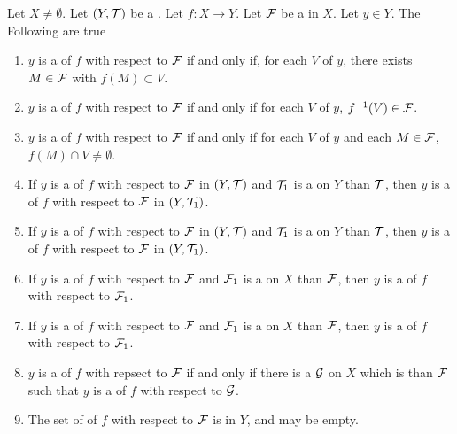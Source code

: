 \begin{prop}[\FunctionLimit]
\label{prop:FunctionLimit}
Let $X \neq \emptyset$. 
Let $(Y,\mathcal{T})$ be a \TopologicalSpace. 
Let $f:X \to Y$. 
Let $\mathcal{F}$ be a \Filter in $X$. 
Let $y \in Y$. 
The Following are true 
\begin{enumerate}[label=(\roman*), ref={\ref{prop:FunctionLimit}.~\roman*}]
    \item
    \label{prop:FunctionLimitCharacterization1}
    $y$ is a \FunctionLimit of $f$ with respect to $\mathcal{F}$ if and only if,
    for each \Neighborhood $V$ of $y$, there exists $M \in \mathcal{F}$ with 
    $f(M) \subset V$. 
    \item
    \label{prop:FunctionLimitCharacterization2}
    $y$ is a \FunctionLimit of $f$ with respect to $\mathcal{F}$ 
    if and only if 
    for each \Neighborhood $V$ of $y$, $f^{-1}(V) \in \mathcal{F}$. 
    \item 
    \label{prop:FunctionClusterPointCharacterization1}
    $y$ is a \FunctionClusterPoint of $f$ with respect to $\mathcal{F}$ 
    if and only if
    for each \Neighborhood $V$ of $y$ and each
    $M \in \mathcal{F}$, $f(M) \cap V \neq \emptyset$. 
    \item
    \label{prop:FunctionLimitCoarser}
    If $y$ is a \FunctionLimit of $f$ with respect to $\mathcal{F}$
    in $(Y,\mathcal{T})$ and $\mathcal{T}_1$ is a \TopologyCoarser 
    \Topology on $Y$ than $\mathcal{T}$, then $y$ is a 
    \FunctionLimit of $f$ with respect to $\mathcal{F}$ in $(Y, \mathcal{T}_1)$. 
    \item
    \label{prop:FunctionClusterPointCoarser}
    If $y$ is a \FunctionClusterPoint of $f$ with respect to $\mathcal{F}$
    in $(Y, \mathcal{T})$ and $\mathcal{T}_1$ is a \TopologyCoarser
    \Topology on $Y$ than $\mathcal{T}$, then $y$ is a 
    \FunctionClusterPoint of $f$ with respect to $\mathcal{F}$ in $(Y, \mathcal{T}_1)$. 
    \item 
    \label{prop:FunctionLimitFiner}
    If $y$ is a \FunctionLimit of $f$ with respect to $\mathcal{F}$ and 
    $\mathcal{F}_1$ is a \FinerFilter \Filter on $X$ than $\mathcal{F}$, then 
    $y$ is a \FunctionLimit of $f$ with respect to $\mathcal{F}_1$. 
    \item 
    \label{prop:FunctionClusterPointFiner}
    If $y$ is a \FunctionClusterPoint of $f$ with respect to $\mathcal{F}$ and 
    $\mathcal{F}_1$ is a \FinerFilter \Filter on $X$ than $\mathcal{F}$, then 
    $y$ is a \FunctionClusterPoint of $f$ with respect to $\mathcal{F}_1$. 
    \item
    \label{prop:FunctionClusterPointCharacterization2}
    $y$ is a \FunctionClusterPoint of $f$ with repsect to $\mathcal{F}$ if and only
    if there is a \Filter $\mathcal{G}$ on $X$ which is \FinerFilter than $\mathcal{F}$ such that 
    $y$ is a \FunctionLimit of $f$ with respect to $\mathcal{G}$. 
    \item
    \label{prop:FunctionClusterPoints:Closed}
    The set of \FunctionClusterPoints of $f$ with respect to $\mathcal{F}$ is \SetClosed in $Y$, and 
    may be empty. 
\end{enumerate}
\end{prop}
